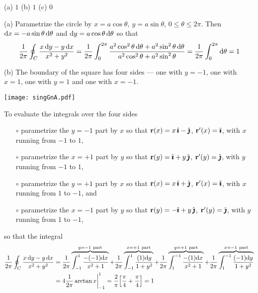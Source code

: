 \begin{answer}
(a) $1$ \qquad
(b) $1$ \qquad
(c) $0$
\end{answer}

\begin{solution} 
(a) Parametrize the circle by 
$x=a\cos\theta,\ y=a\sin\theta$, $0\le\theta\le 2\pi$. Then
$\mathrm{d}x=-a\sin\theta\,\mathrm{d}\theta$ and 
$\mathrm{d}y=a\cos\theta\,\mathrm{d}\theta$ so that
\begin{align*}
\frac{1}{2\pi}\oint_C \frac{x\,\mathrm{d}y-y\,\mathrm{d}x}{x^2+y^2}
=\frac{1}{2\pi}\int_0^{2\pi} \frac{a^2\cos^2\theta\,\mathrm{d}\theta+a^2\sin^2\theta\,\mathrm{d}\theta}
             {a^2\cos^2\theta+a^2\sin^2\theta}
=\frac{1}{2\pi}\int_0^{2\pi}\mathrm{d}\theta=1
\end{align*}

(b) The boundary of the square has four sides --- one
with $y=-1$, one with $x=1$, one with $y=1$ and one with $x=-1$.
\begin{center}
       \texttt{[image: singGnA.pdf]}
\end{center}
To evaluate the integrals over the four sides
\begin{itemize}\itemsep1pt \parskip0pt  %
\item[$\circ$] 
parametrize the $y=-1$ part by $x$ so that
$\mathbf{r}(x)  = x\,\hat{\pmb{\imath}}-\hat{\pmb{\jmath}}$, $\mathbf{r}'(x)=\hat{\pmb{\imath}}$, with $x$ running from $-1$ to $1$,
\item[$\circ$] 
parametrize the $x=+1$ part by $y$ so that
$\mathbf{r}(y)  = \hat{\pmb{\imath}}+y\,\hat{\pmb{\jmath}}$, $\mathbf{r}'(y)=\hat{\pmb{\jmath}}$, with $y$ running from $-1$ to $1$,
\item[$\circ$] 
parametrize the $y=+1$ part by $x$ so that
$\mathbf{r}(x)  = x\,\hat{\pmb{\imath}}+\hat{\pmb{\jmath}}$, $\mathbf{r}'(x)=\hat{\pmb{\imath}}$, with $x$ running from $1$ to $-1$, and
\item[$\circ$] 
parametrize the $x=-1$ part by $y$ so that
$\mathbf{r}(y)  = -\hat{\pmb{\imath}}+y\,\hat{\pmb{\jmath}}$, $\mathbf{r}'(y)=\hat{\pmb{\jmath}}$, with $y$ running from $1$ to $-1$,
\end{itemize}
so that the integral
\begin{align*}
\frac{1}{2\pi}\oint_C \frac{x\,\mathrm{d}y-y\,\mathrm{d}x}{x^2+y^2}
&=\frac{1}{2\pi}\overbrace{\int_{-1}^1 \frac{-(-1)\mathrm{d}x}{x^2+1}}^{y=-1{\rm\ part}}
+\frac{1}{2\pi}\overbrace{\int_{-1}^1 \frac{(1)\mathrm{d}y}{1+y^2}}^{x=+1{\rm\ part}}
+\frac{1}{2\pi}\overbrace{\int^{-1}_1 \frac{-(1)\mathrm{d}x}{x^2+1}}^{y=+1{\rm\ part}}
+\frac{1}{2\pi}\overbrace{\int^{-1}_1 \frac{(-1)\mathrm{d}y}{1+y^2}}^{x=-1{\rm\ part}}
\\
&=4\frac{1}{2\pi}\arctan x\bigg|_{-1}^1
=\frac{2}{\pi}\Big[\frac{\pi}{4}+\frac{\pi}{4}\Big]
=1
\end{align*}


\end{solution}
